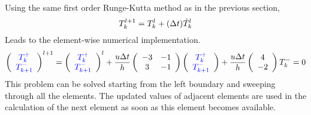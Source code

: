 Using the same first order Runge-Kutta method as in the previous section, 
\begin{equation}
 T^{l+1}_k=T^{l}_k+(\Delta t)\dot{T}^l_k
\nonumber
\end{equation}
Leads to the element-wise numerical implementation.
\begin{eqnarray}
       \left(
\begin{array}{cc}
     {\color{blue} T_k^+}  \\
     {\color{blue}T_{k+1}^-} 
\end{array}
\right)^{l+1}=
 \left(
\begin{array}{cc}
     {\color{blue} T_k^+}  \\
     {\color{blue}T_{k+1}^-} 
\end{array}
\right)^{l}+
\frac{u \Delta t}{h} 
\left(\begin{array}{cc}
    -3 & -1 \\
     3 & -1
\end{array}
\right)
\left(
\begin{array}{cc}
     {\color{blue}T_k^+}  \\
     {\color{blue}T_{k+1}^-} 
\end{array}
\right) + \frac{u \Delta t}{h} \left(
\begin{array}{cc}
     4   \\
     -2 
\end{array}
\right)T_k^-  =0
\nonumber
\end{eqnarray}
This problem can be solved starting from the left boundary and sweeping through all the elements. The updated values of adjacent elements are used in the calculation of the next element as soon as this element becomes available.  
